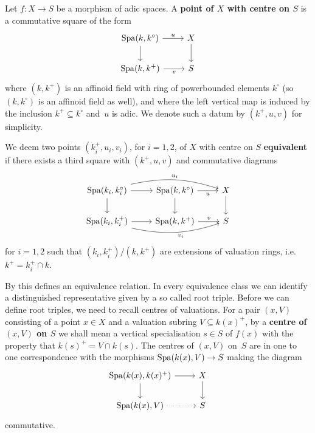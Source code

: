 \begin{defi}
    Let $f\colon X\to S$ be a morphism of adic spaces. A \textbf{point of $X$ with centre on $S$} is a commutative square of the form
    \begin{equation} \label{eqn:pp-test-square} 
        \begin{tikzcd}
            \Spa(k, k^\circ) \ar[r,"u"] \ar[d] & X \ar[d] \\
            \Spa(k, k^+) \ar[r,"v",swap] & S
        \end{tikzcd}
    \end{equation}
    where $(k, k^+)$ is an affinoid field with ring of powerbounded elements $k^\circ$ (so $(k, k^\circ)$ is an affinoid field as well), and where the left vertical map is induced by the inclusion $k^+\subseteq k^\circ$ and~$u$ is adic. We denote such a datum by $(k^+, u, v)$ for simplicity. 

    We deem two points $(k_i^+, u_i, v_i)$, for $i=1,2$, of $X$ with centre on $S$ \textbf{equivalent} if there exists a third square with $(k^+, u, v)$ and commutative diagrams
    \[ 
        \begin{tikzcd}
            \Spa(k_i, k^\circ_i) \ar[r] \ar[d] \ar[rr,"u_i",bend left=15] & \Spa(k, k^\circ) \ar[r,"u",swap] \ar[d] & X \ar[d]  \\
            \Spa(k_i, k^+_i) \ar[r] \ar[rr,"v_i",swap,bend right=15] & \Spa(k, k^+)\ar[r,"v"] & S
        \end{tikzcd}
    \]
    for $i=1,2$ such that $(k_i,k_i^+)/(k,k^+)$ are extensions of valuation rings, i.e.\ $k^+=k_i^+\cap k$.
\end{defi}

By \cite[Lemma~4.3]{Solodov-vertical-compactification} this defines an equivalence relation.
In every equivalence class we can identify a distinguished representative given by a so called root triple.
Before we can define root triples, we need to recall centres of valuations.
For a pair $(x, V)$ consisting of a point $x\in X$ and a valuation subring $V\subseteq k(x)^+$, by a {\bf centre of $(x, V)$ on $S$} we shall mean a vertical specialisation $s\in S$ of $f(x)$ with the property that $k(s)^+ = V\cap k(s)$.
The centres of $(x,V)$ on~$S$ are in one to one correspondence with the morphisms $\operatorname{Spa}(k(x),V) \to S$ making the diagram
\[
 \begin{tikzcd}
     \Spa(k(x),k(x)^+)  \ar[r]  \ar[d]  & X \ar[d]  \\
     \Spa(k(x),V)       \ar[r,dotted]          & S
 \end{tikzcd}
\]
commutative.

